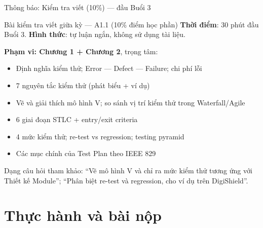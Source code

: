 \documentclass[aspectratio=169,12pt]{beamer}
\begin{document}
\begin{frame}{Thông báo: Kiểm tra viết (10\%) --- đầu Buổi 3}
  \begin{alertblock}{Bài kiểm tra viết giữa kỳ --- A1.1 (10\% điểm học phần)}
    \textbf{Thời điểm}: 30 phút đầu Buổi 3. \quad \textbf{Hình thức}: tự luận ngắn,
    không sử dụng tài liệu.
  \end{alertblock}

  \vspace{0.4em}
  \textbf{Phạm vi: Chương 1 + Chương 2}, trọng tâm:
  \begin{itemize}
    \item Định nghĩa kiểm thử; Error --- Defect --- Failure; chi phí lỗi
    \item 7 nguyên tắc kiểm thử (phát biểu + ví dụ)
    \item Vẽ và giải thích mô hình V; so sánh vị trí kiểm thử trong Waterfall/Agile
    \item 6 giai đoạn STLC + entry/exit criteria
    \item 4 mức kiểm thử; re-test vs regression; testing pyramid
    \item Các mục chính của Test Plan theo IEEE 829
  \end{itemize}

  \vspace{0.3em}
  \small Dạng câu hỏi tham khảo: ``Vẽ mô hình V và chỉ ra mức kiểm thử tương ứng với
  Thiết kế Module''; ``Phân biệt re-test và regression, cho ví dụ trên DigiShield''.
\end{frame}

\section{Thực hành và bài nộp}
\end{document}
